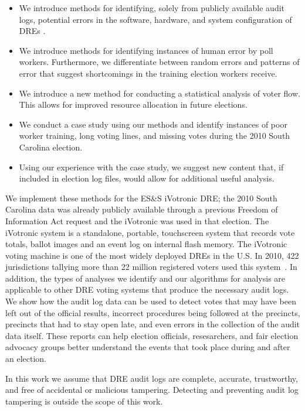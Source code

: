 \documentclass[letterpaper,twocolumn,10pt]{article}
\begin{document}
\begin{itemize}
\item We introduce methods for identifying, solely from publicly available audit
  logs, potential errors in the software, hardware, and system configuration of
  DREs .
\item We introduce methods for identifying instances of human error by poll
  workers. Furthermore, we differentiate between random
  errors and patterns of error that suggest shortcomings in the training
  election workers receive.
\item We introduce a new method for conducting a statistical analysis of voter
  flow. This allows for improved resource allocation in future elections.
\item We conduct a case study using our methods and identify instances of poor
  worker training, long voting lines, and missing votes during the 2010 South
  Carolina election.
\item Using our experience with the case study, we suggest new content that, if
  included in election log files, would allow for additional useful analysis.
\end{itemize}

We implement these methods for the ES\&S 
iVotronic DRE; the 2010 South Carolina data was already publicly available 
through a previous Freedom of Information Act request and the iVotronic was 
used in that election. The iVotronic system is a standalone, portable, 
touchscreen system that records vote totals, ballot images and an event log 
on internal flash memory. The iVotronic voting machine is one of the most 
widely deployed DREs in the U.S. In 2010, 422 jurisdictions tallying more 
than 22 million registered voters used this system~\cite{VerVot2010}. In 
addition, the types of analyses we identify and our algorithms for analysis 
are applicable to other DRE voting systems that produce the necessary audit 
logs. We show how the audit log data can be used to detect votes that may 
have been left out of the official results, incorrect procedures being 
followed at the precincts, precincts that had to stay open late, and even 
errors in the collection of the audit data itself. These reports can help 
election officials, resesarchers, and fair election advocacy groups better
understand the events that took place during and after an election. 

In this work we assume that DRE audit logs are complete, accurate, trustworthy,
and free of accidental or malicious tampering. Detecting and preventing audit
log tampering is outside the scope of this work. 
\end{document}
